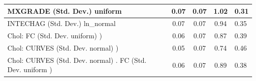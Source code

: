 \begin{table}
\begin{center}
\begin{tabular}{|l|l|c|c|c|l|}
			\hline
			MXGRADE (Std. Dev.) uniform &  & 0.07 & 0.07 & 1.02 & 0.31 \\
			\hline
			INTECHAG (Std. Dev.) ln_normal &  & 0.07 & 0.07 & 0.94 & 0.35 \\
			\hline
			 Chol: FC (Std. Dev. uniform) ) &  & 0.06 & 0.07 & 0.87 & 0.39 \\
			\hline
			 Chol: CURVES (Std. Dev. normal) ) &  & 0.05 & 0.07 & 0.74 & 0.46 \\
			\hline
			 Chol: CURVES (Std. Dev. normal) . FC (Std. Dev.   uniform ) &  & 0.06 & 0.07 & 0.89 & 0.38 \\
			\hline
		\end{tabular}
	\end{center}
\end{table}